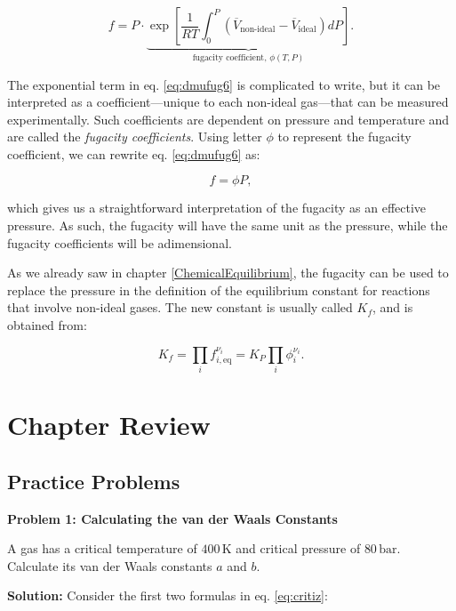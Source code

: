 \documentclass[
  9pt,
]{extbook}
\theoremstyle{definition}
\theoremstyle{definition}
\theoremstyle{definition}
\theoremstyle{definition}
\theoremstyle{remark}
\begin{document}
\begin{equation}
f = P \cdot \underbrace{\exp\left[ \frac{1}{RT} \int_0^P \left(\overline{V}_{\text{non-ideal}}-\overline{V}_{\text{ideal}} \right) dP \right]}_{\text{fugacity coefficient, }\phi(T,P)}.
\label{eq:dmufug6}
\end{equation}

The exponential term in eq. \eqref{eq:dmufug6} is complicated to write, but it can be interpreted as a coefficient---unique to each non-ideal gas---that can be measured experimentally. Such coefficients are dependent on pressure and temperature and are called the \emph{fugacity coefficients}. Using letter \(\phi\) to represent the fugacity coefficient, we can rewrite eq. \eqref{eq:dmufug6} as:

\begin{equation}
f = \phi P,
\label{eq:dmufug7}
\end{equation}

which gives us a straightforward interpretation of the fugacity as an effective pressure. As such, the fugacity will have the same unit as the pressure, while the fugacity coefficients will be adimensional.

As we already saw in chapter \ref{ChemicalEquilibrium}, the fugacity can be used to replace the pressure in the definition of the equilibrium constant for reactions that involve non-ideal gases. The new constant is usually called \(K_f\), and is obtained from:

\begin{equation}
K_f=\prod_i f_{i,\text{eq}}^{\nu_i} = K_P \prod_i \phi_{i}^{\nu_i}.
\label{eq:kfdef}
\end{equation}

\section{Chapter Review}\label{rev11}

\subsection{Practice Problems}\label{exer11}

\textbf{Problem 1: Calculating the van der Waals Constants}

A gas has a critical temperature of \(400\,\text{K}\) and critical pressure of \(80\,\text{bar}\). Calculate its van der Waals constants \(a\) and \(b\).

\textbf{Solution:} Consider the first two formulas in eq. \eqref{eq:critiz}:
\end{document}
